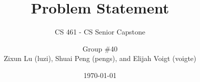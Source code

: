 



\title{Problem Statement}
\subtitle{CS 461 - CS Senior Capstone}
\author{
  Group \#40 \\
  Zixun Lu (luzi),
  Shuai Peng (pengs), and
  Elijah Voigt (voigte)
}
\date{\today}
\maketitle
\begin{abstract}
  
\end{abstract}

\clearpage







\clearpage




